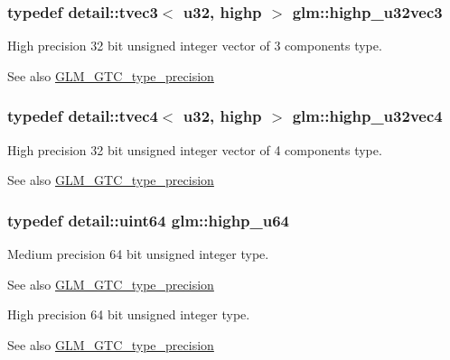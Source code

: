 \subsubsection[{\texorpdfstring{highp\+\_\+u32vec3}{highp_u32vec3}}]{\setlength{\rightskip}{0pt plus 5cm}typedef detail\+::tvec3$<$ u32, highp $>$ {\bf glm\+::highp\+\_\+u32vec3}}\hypertarget{group__gtc__type__precision_gab1e386f5e415e00f800edf5d15207286}{}\label{group__gtc__type__precision_gab1e386f5e415e00f800edf5d15207286}
High precision 32 bit unsigned integer vector of 3 components type. \begin{DoxySeeAlso}{See also}
\hyperlink{group__gtc__type__precision}{G\+L\+M\+\_\+\+G\+T\+C\+\_\+type\+\_\+precision} 
\end{DoxySeeAlso}
\subsubsection[{\texorpdfstring{highp\+\_\+u32vec4}{highp_u32vec4}}]{\setlength{\rightskip}{0pt plus 5cm}typedef detail\+::tvec4$<$ u32, highp $>$ {\bf glm\+::highp\+\_\+u32vec4}}\hypertarget{group__gtc__type__precision_ga9418a8d549d344d4f7b7158771a2fdfe}{}\label{group__gtc__type__precision_ga9418a8d549d344d4f7b7158771a2fdfe}
High precision 32 bit unsigned integer vector of 4 components type. \begin{DoxySeeAlso}{See also}
\hyperlink{group__gtc__type__precision}{G\+L\+M\+\_\+\+G\+T\+C\+\_\+type\+\_\+precision} 
\end{DoxySeeAlso}
\subsubsection[{\texorpdfstring{highp\+\_\+u64}{highp_u64}}]{\setlength{\rightskip}{0pt plus 5cm}typedef detail\+::uint64 {\bf glm\+::highp\+\_\+u64}}\hypertarget{group__gtc__type__precision_ga6006ea883d3c0491791650b2fb84de39}{}\label{group__gtc__type__precision_ga6006ea883d3c0491791650b2fb84de39}
Medium precision 64 bit unsigned integer type. \begin{DoxySeeAlso}{See also}
\hyperlink{group__gtc__type__precision}{G\+L\+M\+\_\+\+G\+T\+C\+\_\+type\+\_\+precision}
\end{DoxySeeAlso}
High precision 64 bit unsigned integer type. \begin{DoxySeeAlso}{See also}
\hyperlink{group__gtc__type__precision}{G\+L\+M\+\_\+\+G\+T\+C\+\_\+type\+\_\+precision} 
\end{DoxySeeAlso}
